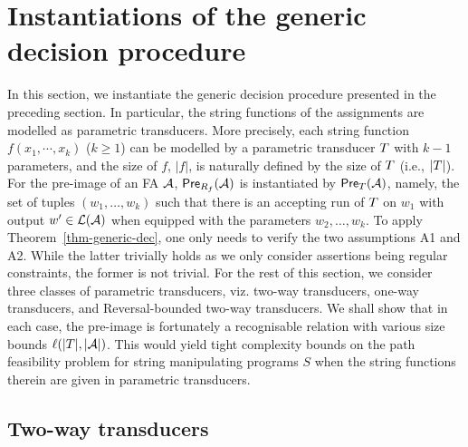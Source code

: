 
\section{Instantiations of the generic decision procedure}

In this section, we instantiate the generic decision procedure presented in the preceding section. In particular, the string functions of the assignments are modelled as parametric transducers. More precisely, each string function $f(x_1, \cdots, x_k)$ ($k\geq 1$) can be modelled by a parametric transducer $T$  
with $k-1$ parameters, and the size of $f$, $|f|$, is naturally defined by the size of $T$ (i.e., $|T|$). For the pre-image of an FA $\mathcal{A}$,  $\textsf{Pre}_{R_f}(\mathcal{A})$ is instantiated by $\textsf{Pre}_{T}(\mathcal{A})$, namely, the set of tuples $(w_1,\ldots, w_k)$ such that there is an accepting run of $T$ on $w_1$ with output $w'\in \mathcal{L}(\mathcal{A})$ when equipped with the parameters $w_2,\ldots, w_k$. To apply Theorem~\ref{thm-generic-dec}, one only needs to verify the two assumptions A1 and A2. While the latter trivially holds as we only consider assertions being regular constraints, the former is not trivial. For the rest of this section, we consider three classes of parametric transducers, viz. two-way transducers, one-way transducers, and Reversal-bounded two-way transducers. We shall show that in each case, the pre-image is fortunately a recognisable relation with various size bounds $\ell(|T|, |\mathcal{A}|)$. This would yield tight complexity bounds on the path feasibility problem for string manipulating programs $S$ when the string functions therein are given in parametric transducers.  



 
\subsection{Two-way transducers}\label{sec-2way}




